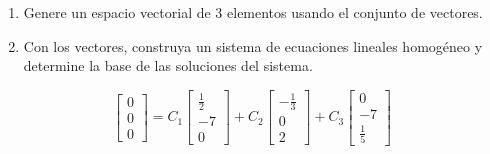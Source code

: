 \documentclass[
  11,
]{article}
\providecommand{\tightlist}{%
  \setlength{\itemsep}{0pt}\setlength{\parskip}{0pt}}
\begin{document}
\begin{enumerate}
\def\labelenumi{\alph{enumi})}
\setcounter{enumi}{1}
\tightlist
\item
  Genere un espacio vectorial de 3 elementos usando el conjunto de
  vectores.
\item
  Con los vectores, construya un sistema de ecuaciones lineales
  homogéneo y determine la base de las soluciones del sistema.
\end{enumerate}

\[
  \begin{bmatrix}0\\0\\0\end{bmatrix} = C_1\begin{bmatrix}\frac{1}{2} \\ -7 \\ 0\end{bmatrix} + C_2\begin{bmatrix}-\frac{1}{3}\\0\\2\end{bmatrix} + C_3\begin{bmatrix}0\\-7\\\frac{1}{5}\end{bmatrix}
  \]
\end{document}
